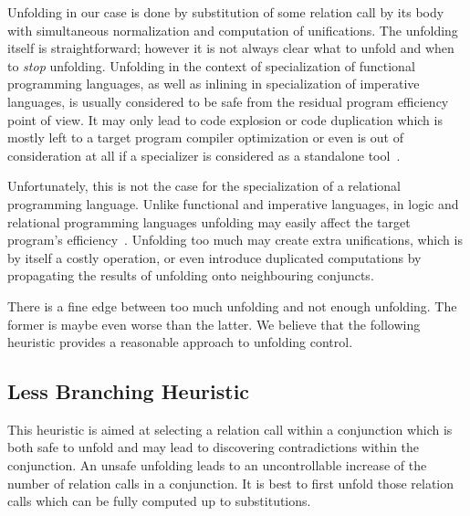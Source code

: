 Unfolding in our case is done by substitution of some relation call by its body with simultaneous normalization and computation of unifications.
The unfolding itself is straightforward; however it is not always clear what to unfold and when to \emph{stop} unfolding.
Unfolding in the context of specialization of functional programming languages, as well as inlining in specialization of imperative languages, is usually considered to be safe from the residual program efficiency point of view.
It may only lead to code explosion or code duplication which is mostly left to a target program compiler optimization or even is out of consideration at all if a specializer is considered as a standalone tool~\cite{jonesbook}.

Unfortunately, this is not the case for the specialization of a relational programming language.
Unlike functional and imperative languages, in logic and relational programming languages unfolding may easily affect the target program's efficiency~\cite{leuschel2002logic, gallagher1993tutorial}.
Unfolding too much may create extra unifications, which is by itself a costly operation, or even introduce duplicated computations by propagating the results of unfolding onto neighbouring conjuncts.

There is a fine edge between too much unfolding and not enough unfolding.
The former is maybe even worse than the latter.
We believe that the following heuristic provides a reasonable approach to unfolding control.

\subsection{Less Branching Heuristic}
\label{sec:heurictic}

This heuristic is aimed at selecting a relation call within a conjunction which is both safe to unfold and may lead to discovering contradictions within the conjunction.
An unsafe unfolding leads to an uncontrollable increase of the number of relation calls in a conjunction.
It is best to first unfold those relation calls which can be fully computed up to substitutions.

